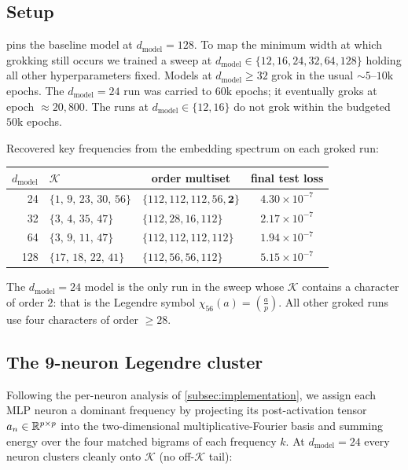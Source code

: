 \subsection{Setup}
\label{subsec:legendre-setup}

 pins the baseline model at
$d_{\text{model}} = 128$.  To map the minimum width at which grokking
still occurs we trained a sweep at $d_{\text{model}} \in \{12, 16, 24,
32, 64, 128\}$ holding all other hyperparameters fixed.  Models at
$d_{\text{model}} \geq 32$ grok in the usual $\sim 5\text{--}10\mathrm{k}$
epochs.  The $d_{\text{model}} = 24$ run was carried to $60\mathrm{k}$
epochs; it eventually groks at epoch $\approx 20{,}800$.  The runs at
$d_{\text{model}} \in \{12, 16\}$ do not grok within the budgeted
$50\mathrm{k}$ epochs.

Recovered key frequencies from the embedding spectrum on each groked run:
\begin{center}
\begin{tabular}{r|l|l|c}
  $d_{\text{model}}$ & $\mathcal{K}$ &
    \multicolumn{1}{c|}{order multiset} & final test loss \\
  \hline
  24  & $\{1,\,9,\,23,\,30,\,56\}$ & $\{112,112,112,56,\mathbf{2}\}$
      & $4.30 \times 10^{-7}$ \\
  32  & $\{3,\,4,\,35,\,47\}$      & $\{112,28,16,112\}$
      & $2.17 \times 10^{-7}$ \\
  64  & $\{3,\,9,\,11,\,47\}$      & $\{112,112,112,112\}$
      & $1.94 \times 10^{-7}$ \\
  128 & $\{17,\,18,\,22,\,41\}$    & $\{112,56,56,112\}$
      & $5.15 \times 10^{-7}$ \\
\end{tabular}
\end{center}

The $d_{\text{model}} = 24$ model is the only run in the sweep whose
$\mathcal{K}$ contains a character of order $2$: that is the Legendre
symbol $\chi_{56}(a) = \left(\frac{a}{p}\right)$.  All other groked
runs use four characters of order $\geq 28$.

\subsection{The 9-neuron Legendre cluster}
\label{subsec:legendre-cluster}

Following the per-neuron analysis of \cref{subsec:implementation}, we
assign each MLP neuron a dominant frequency by projecting its
post-activation tensor $a_n \in \mathbb{R}^{p \times p}$ into the
two-dimensional multiplicative-Fourier basis and summing energy over
the four matched bigrams of each frequency $k$.  At
$d_{\text{model}} = 24$ every neuron clusters cleanly onto $\mathcal{K}$
(no off-$\mathcal{K}$ tail):

